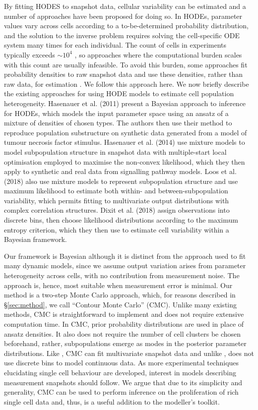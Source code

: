 By fitting HODES to snapshot data, cellular variability can be estimated and a number of approaches have been proposed for doing so. In HODEs, parameter values vary across cells according to a to-be-determined probability distribution, and the solution to the inverse problem requires solving the cell-specific ODE system many times for each individual. The count of cells in experiments typically exceeds $\sim10^4$ \cite{hasenauer2011identification}, so approaches where the computational burden scales with this count are usually infeasible. To avoid this burden, some approaches fit probability densities to raw snapshot data and use these densities, rather than raw data, for estimation \cite{hasenauer2011identification,hasenauer2014ode,loos2018hierarchical,dixit2018maximum}. We follow this approach here. We now briefly describe the existing approaches for using HODE models to estimate cell population heterogeneity. Hasenauer et al. (2011) present a Bayesian approach to inference for HODEs, which models the input parameter space using an ansatz of a mixture of densities of chosen types. The authors then use their method to reproduce population substructure on synthetic data generated from a model of tumour necrosis factor stimulus. Hasenauer et al. (2014) use mixture models to model subpopulation structure in snapshot data with multiple-start local optimisation employed to maximise the non-convex likelihood, which they then apply to synthetic and real data from signalling pathway models. Loos et al. (2018) also use mixture models to represent subpopulation structure and use maximum likelihood to estimate both within- and between-subpopulation variability, which permits fitting to multivariate output distributions with complex correlation structures. Dixit et al. (2018) assign observations into discrete bins, then choose likelihood distributions according to the maximum entropy criterion, which they then use to estimate cell variability within a Bayesian framework.

Our framework is Bayesian although it is distinct from the approach used to fit many dynamic models, since we assume output variation arises from parameter heterogeneity across cells, with no contribution from measurement noise. The approach is, hence, most suitable when measurement error is minimal. Our method is a two-step Monte Carlo approach, which, for reasons described in \S \ref{sec:method}, we call ``Contour Monte Carlo'' (CMC). Unlike many existing methods, CMC is straightforward to implement and does not require extensive computation time. In CMC, prior probability distributions are used in place of ansatz densities. It also does not require the number of cell clusters be chosen beforehand, rather, subpopulations emerge as modes in the posterior parameter distributions. Like \cite{loos2018hierarchical}, CMC can fit multivariate snapshot data and unlike \cite{dixit2018maximum}, does not use discrete bins to model continuous data. As more experimental techniques elucidating single cell behaviour are developed, interest in models describing measurement snapshots should follow. We argue that due to its simplicity and generality, CMC can be used to perform inference on the proliferation of rich single cell data and, thus, is a useful addition to the modeller's toolkit.


